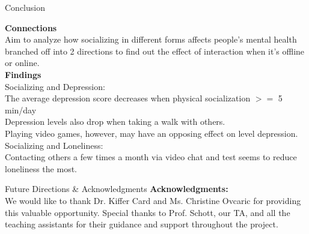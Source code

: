 \documentclass{beamer}
\begin{document}
\begin{frame}{Conclusion}

\textbf{Connections}\\
Aim to analyze how socializing in different forms affects people’s mental health\\
branched off into 2 directions to find out the effect of  interaction when it's offline or online.\\

\textbf{Findings}\\ 
Socializing and Depression:\\
The average depression score decreases when physical socialization $>=$ 5 min/day\\
Depression levels also drop when taking a walk with others.\\
Playing video games, however, may have an opposing effect on level depression.\\
Socializing and Loneliness:\\
Contacting others a few times a month via video chat and test seems to reduce loneliness the most.\\

    
\end{frame}

\begin{frame}{Future Directions & Acknowledgments}
\textbf{Acknowledgments:}\\
We would like to thank Dr. Kiffer Card and Ms. Christine Ovcaric for providing this valuable opportunity. Special thanks to Prof. Schott, our TA, and all the teaching assistants for their guidance and support throughout the project.
\end{frame}
\end{document}
